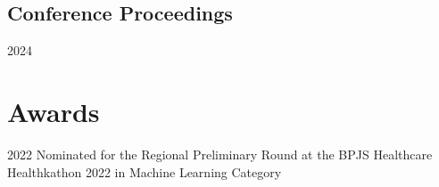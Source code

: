 \documentclass[12pt,letterpaper]{report}
\newcommand{\listitemspace}{0.25em}
\renewenvironment{itemize}
{\begin{list}{}{\setlength{\leftmargin}{0em}
                \setlength{\parskip}{0em}
                \setlength{\itemsep}{\listitemspace}
                \setlength{\parsep}{\listitemspace}}}
{\end{list}}
\begin{document}
    \subsection*{Conference Proceedings}
    \begin{tablist}
        \item[2024] \tab{}
    \end{tablist}



    \section*{Awards}
    \begin{tablist}
        \item[2022] \tab{}Nominated for the Regional Preliminary Round at the BPJS Healthcare Healthkathon 2022 in Machine Learning Category
    \end{tablist}


\end{document}
